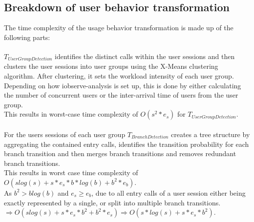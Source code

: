 \documentclass[10pt,a4paper]{article}
\begin{document}
	\subsection{Breakdown of user behavior transformation}
	The time complexity of the usage behavior transformation is made up of the following parts:\\
	\\
    $T_{UserGroupDetection}$ identifies the distinct calls within the user sessions and then clusters the user sessions into user groups using the X-Means clustering algorithm. After clustering, it sets the workload intensity of each user group. Depending on how iobserve-analysis is set up, this is done by either calculating the number of concurrent users or the inter-arrival time of users from the user group.\\
    This results in worst-case time complexity of $O(s^{2}*e_s)$ for $T_{UserGroupDetection}$.\\
	\\
	For the users sessions of each user group $T_{BranchDetection}$ creates a tree structure by aggregating the contained entry calls, identifies the transition probability for each branch transition and then merges branch transitions and removes redundant branch transitions.\\
	This results in worst case time complexity of $O(slog(s) + s*e_s*b*log(b) + b^2*e_b)$.\\
	As $b^2 > blog(b)$ and $e_s \geq e_b$, due to all entry calls of a user session either being exactly represented by a single, or split into multiple branch transitions.\\
	$\Rightarrow O(slog(s) + s*e_s*b^2 + b^2*e_s) \Rightarrow O(s*log(s) + s*e_s*b^2)$.\\
\end{document}
